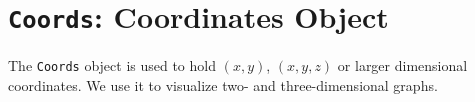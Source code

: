 \chapter{{\tt Coords}: Coordinates Object}
\par
The {\tt Coords} object is used to hold $(x,y)$, $(x,y,z)$ or
larger dimensional coordinates.
We use it to visualize two- and three-dimensional graphs.
